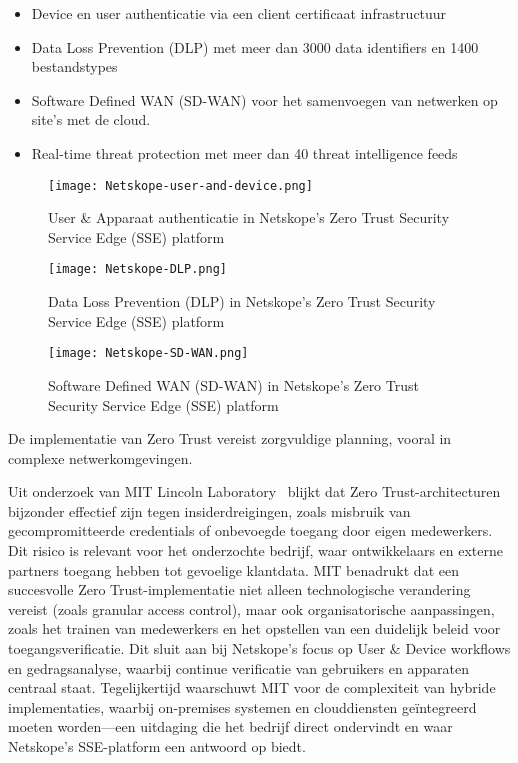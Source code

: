 \begin{itemize}
  \item Device en user authenticatie via een client certificaat infrastructuur
  \item Data Loss Prevention (DLP) met meer dan 3000 data identifiers en 1400 bestandstypes
  \item Software Defined WAN (SD-WAN) voor het samenvoegen van netwerken op site's met de cloud.
  \item Real-time threat protection met meer dan 40 threat intelligence feeds
\end{itemize}

\begin{figure}
  \centering
  \texttt{[image: Netskope-user-and-device.png]}
  \caption[]{User \& Apparaat authenticatie in Netskope's Zero Trust Security Service Edge (SSE) platform~\autocite{Netskope2024}}
\end{figure}

\begin{figure}
  \centering
  \texttt{[image: Netskope-DLP.png]}
  \caption[]{Data Loss Prevention (DLP) in Netskope's Zero Trust Security Service Edge (SSE) platform~\autocite{Netskope2024}}
\end{figure}

\begin{figure}
  \centering
  \texttt{[image: Netskope-SD-WAN.png]}
  \caption[]{Software Defined WAN (SD-WAN) in Netskope's Zero Trust Security Service Edge (SSE) platform~\autocite{Netskope2024}}
\end{figure}


De implementatie van Zero Trust vereist zorgvuldige planning, vooral in complexe netwerkomgevingen.


Uit onderzoek van MIT Lincoln Laboratory~\autocite{MIT2022} blijkt dat Zero Trust-architecturen bijzonder effectief zijn tegen insiderdreigingen, zoals misbruik van gecompromitteerde credentials of onbevoegde toegang door eigen medewerkers. 
Dit risico is relevant voor het onderzochte bedrijf, waar ontwikkelaars en externe partners toegang hebben tot gevoelige klantdata. 
MIT benadrukt dat een succesvolle Zero Trust-implementatie niet alleen technologische verandering vereist (zoals granular access control), maar ook organisatorische aanpassingen, zoals het trainen van medewerkers en het opstellen van een duidelijk beleid voor toegangsverificatie. 
Dit sluit aan bij Netskope’s focus op User \& Device workflows en gedragsanalyse, waarbij continue verificatie van gebruikers en apparaten centraal staat. 
Tegelijkertijd waarschuwt MIT voor de complexiteit van hybride implementaties, waarbij on-premises systemen en clouddiensten geïntegreerd moeten worden—een uitdaging die het bedrijf direct ondervindt en waar Netskope’s SSE-platform een antwoord op biedt.

